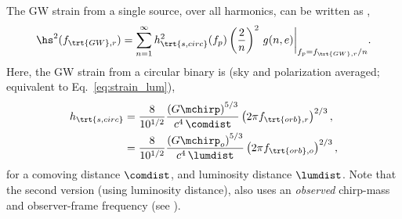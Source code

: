 \documentclass[10pt, oneside, onecolumn]{article}   	%
\newcommand{\hscirc}{h_\trt{s,circ}}
\newcommand{\frstgw}{f_{\trt{GW},r}}
\newcommand{\frstorb}{f_{\trt{orb},r}}
\newcommand{\fobsorb}{f_{\trt{orb},o}}
\begin{document}
            The GW strain from a single source, over all harmonics, can be written as \citep[][Eq.~9]{amaro-seoane2010},
            \begin{equation}
                \label{eq:gw_strain_instant}
                \hs^2(\frstgw) = \sum_{n=1}^\infty \hscirc^2(f_p) \left(\frac{2}{n}\right)^2 \, g(n,e) \bigg|_{f_p = \frstgw/n}.
            \end{equation}
            Here, the GW strain from a circular binary is \citep[][Eq.~7]{sesana2008} (sky and polarization averaged; equivalent to Eq.~\ref{eq:strain_lum}),
            \begin{equation}
            \begin{split}
                \label{eq:gw_strain_amp}
                \hscirc
                    & = \frac{8}{10^{1/2}} \frac{\left(G\mchirp\right)^{5/3}}{c^4 \, \comdist} \left(2 \pi \frstorb \right)^{2/3}, \\
                    & = \frac{8}{10^{1/2}} \frac{\left(G\mchirp_o\right)^{5/3}}{c^4 \, \lumdist} \left(2 \pi \fobsorb \right)^{2/3},
            \end{split}
            \end{equation}
            for a comoving distance $\comdist$, and luminosity distance $\lumdist$.  Note that the second version (using luminosity distance), also uses an \textit{observed} chirp-mass and observer-frame frequency (see ).
\end{document}
